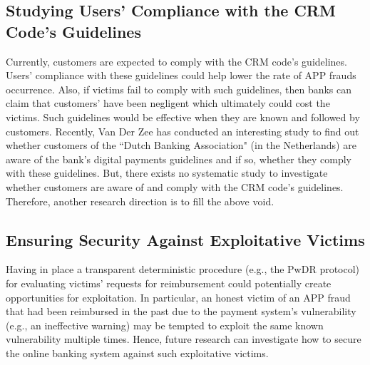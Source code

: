 \subsection{Studying Users' Compliance with the CRM Code's Guidelines}

Currently,   customers are expected to comply with the CRM code's guidelines.  Users'  compliance with these guidelines  could help lower the rate of APP frauds occurrence.  Also, if victims fail to comply with such  guidelines, then banks can claim that customers' have been negligent which ultimately could cost the victims. Such guidelines would be effective when they are known and followed by customers. Recently, Van Der Zee \cite{zee2021shifting}  has conducted an interesting study to find out whether customers of the ``Dutch Banking Association" (in the Netherlands) are aware of the bank's digital payments guidelines and if so, whether they comply with these guidelines.  But, there exists no systematic study to  investigate whether  customers are aware of and comply with the CRM code's  guidelines. Therefore, another research direction is to fill  the above void. 



\subsection{Ensuring Security Against Exploitative Victims}



Having in place a transparent deterministic procedure (e.g.,  the PwDR protocol)  for evaluating victims' requests for reimbursement  could potentially create opportunities for exploitation. In particular, an honest victim  of an APP fraud that had been reimbursed in the past due to the payment system's vulnerability (e.g., an  ineffective warning) may be tempted to  exploit the same  known vulnerability multiple times. Hence, future research can investigate how to secure the online banking system against such exploitative victims.











